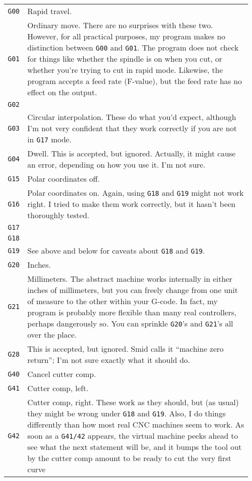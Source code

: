 \documentclass[titlepage,oneside,10pt]{article}
\begin{document}
\begin{longtable}{lp{10cm}}
{\tt G00}&Rapid travel.\\
{\tt G01}&Ordinary move. There are no surprises with these
two. However, for all practical purposes, my program makes no
distinction between {\tt G00} and {\tt G01}. The program does not
check for things like whether the spindle is  on when you cut, or
whether you're trying to cut in rapid mode. Likewise, the program
accepts a feed rate (F-value), but the feed rate has no effect on the
output. \\
{\tt G02}&\\
{\tt G03}&Circular interpolation. These do what you'd expect,
although I'm not very confident that they work correctly if you are not
in {\tt G17} mode.\\
{\tt G04}&Dwell. This is accepted, but ignored. Actually, it might
cause an error, depending on how you use it. I'm not sure.\\
{\tt G15}&Polar coordinates off.\\
{\tt G16}&Polar coordinates on. Again, using {\tt G18} and {\tt G19}
might not work right. I tried to make them work correctly, but it
hasn't been thoroughly tested.\\
{\tt G17}&\\
{\tt G18}&\\
{\tt G19}&See above and below for caveats about {\tt G18} and {\tt G19}.\\
{\tt G20}&Inches.\\
{\tt G21}&Millimeters. The abstract machine works internally in either
inches of millimeters, but you can freely change from one unit of
measure to the other within your G-code. In fact, my program is
probably more flexible than many real controllers, perhaps dangerously
so. You can sprinkle {\tt G20}'s and {\tt G21}'s all over the place.\\ 
{\tt G28}&This is accepted, but ignored. Smid calls it ``machine zero
return''; I'm not sure exactly what it should do.\\
{\tt G40}&Cancel cutter comp.\\
{\tt G41}&Cutter comp, left.\\
{\tt G42}&Cutter comp, right. These work as they should, but (as
usual) they might be wrong under {\tt G18} and {\tt G19}. Also, I do
things differently than how most real CNC machines seem to
work. As soon as a {\tt G41/42} appears, the virtual machine peeks
ahead to see what the next statement will be, and it bumps the tool
out by the cutter comp amount to be ready to cut the very first curve

\end{longtable}
\end{document}
